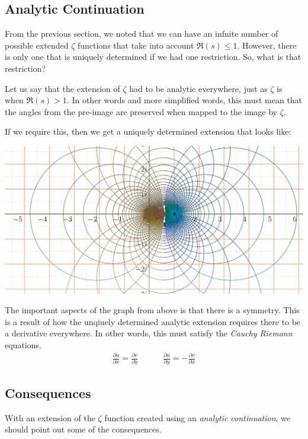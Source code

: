 \documentclass[14pt]{extarticle}
\begin{document}
\subsection{Analytic Continuation}
From the previous section, we noted that we can have an infnite number of possible extended $\zeta$ functions that take into account
$\Re(s) \leq 1$. However, there is only one that is uniquely determined if we had one restriction. So, what is that restriction?

Let us say that the extension of $\zeta$ had to be analytic everywhere, just as $\zeta$ is when $\Re(s) > 1$. In other words and more
simplified words, this must mean that the angles from the pre-image are preserved when mapped to the image by $\zeta$.

If we require this, then we get a uniquely determined extension that looks like:
\begin{center}
	\includegraphics[scale=0.225]{zeta_developed}
\end{center}

The important aspects of the graph from above is that there is a symmetry. This is a result of how the unqiuely determined analytic
extension requires there to be a derivative everywhere. In other words, this must satisfy the \textit{Cauchy Riemann} equations.
\begin{align*}
    \frac{\partial u}{\partial x} = \frac{\partial v}{\partial y} \quad\quad\quad
    \frac{\partial u}{\partial y} = -\frac{\partial v}{\partial x}
\end{align*}

\subsection{Consequences}
With an extension of the $\zeta$ function created using an \textit{analytic continuation}, we should point out some of the consequences.
\end{document}
